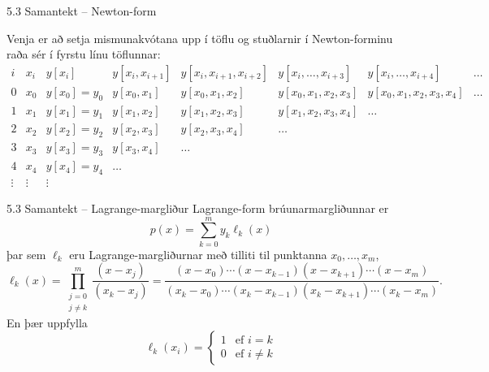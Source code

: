 \begin{frame}{5.3 Samantekt -- Newton-form} 

Venja er að setja mismunakvótana upp í töflu og stuðlarnir
í Newton-forminu raða sér í fyrstu línu töflunnar:
{\footnotesize
\begin{equation*}
  \begin{array}{c|c|cccccc}
    i & x_i & y[x_i] & y[x_i,x_{i+1}] & y[x_i,x_{i+1},x_{i+2}]
    & y[x_i,\dots,x_{i+3}] &y[x_i,\dots,x_{i+4}] &\dots  \\
    \hline
    0 & x_0 & y[x_0] = y_0 & y[x_0,x_1] & y[x_0,x_1,x_2]
    & y[x_0,x_1,x_2,x_3]&y[x_0,x_1,x_2,x_3,x_4]& \dots \\
    1 & x_1 & y[x_1] = y_1 & y[x_1,x_2] & y[x_1,x_2,x_3] &
    y[x_1,x_2,x_3,x_4]&\dots \\
    2 & x_2 & y[x_2] = y_2 & y[x_2,x_3] &y[x_2,x_3,x_4]&\dots & \\
    3 & x_3 & y[x_3] = y_3 & y[x_3,x_4] &\dots & & \\
    4 & x_4 & y[x_4] = y_4 & \dots &  \\
\vdots & \vdots &\vdots
  \end{array}
\end{equation*}
}
\end{frame}

\begin{frame}{5.3 Samantekt -- Lagrange-margliður} 
Lagrange-form brúunarmargliðunnar er
$$
p(x)=\sum_{k=0}^m y_k\ell_{k}(x)
$$
þar sem $\ell_{k}$ eru Lagrange-margliðurnar með tilliti til
punktanna $x_0,\dots,x_m$,
{\small
\begin{equation*}
	\ell_{k}(x) = \prod_
	{\substack{j=0\\ j\neq k}}^m\dfrac{(x-x_j)}{(x_k-x_j)}
	= \dfrac{(x-x_0)\cdots(x-x_{k-1})
		(x-x_{k+1})\cdots(x-x_m)}
	{(x_k-x_0)\cdots(x_k-x_{k-1})
		(x_k-x_{k+1})\cdots(x_k-x_m)}.
\end{equation*}
}
\pause
En þær uppfylla
\begin{equation*}
  \ell_{k}(x_i) = \left\{ \begin{array}{cc}
      1 & \text{ef } i = k \\
      0 & \text{ef } i \not= k
  \end{array} \right.
\end{equation*}

\end{frame}


